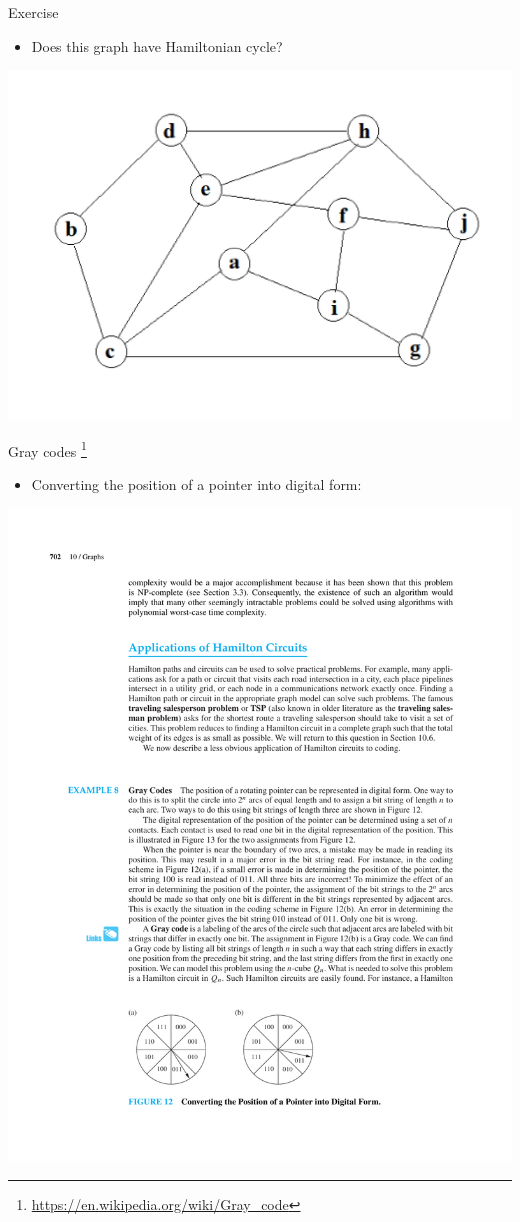 \documentclass{beamer}
\theoremstyle{definition}
\begin{document}
\begin{frame}{Exercise}
    \begin{itemize}
        \item Does this graph have Hamiltonian cycle?
    \end{itemize}
    \centering \includegraphics[width=.7\linewidth]{p1.jpg}
\end{frame}

\begin{frame}{Gray codes \footnote{\scriptsize \url{https://en.wikipedia.org/wiki/Gray_code}}}
   \begin{itemize}
        \item Converting the position of a pointer into digital form:
    \end{itemize}
    \centering \includegraphics[trim={5cm 3.2cm 8cm 21cm},clip,width=.8\linewidth]{p702}
\end{frame}
\end{document}

